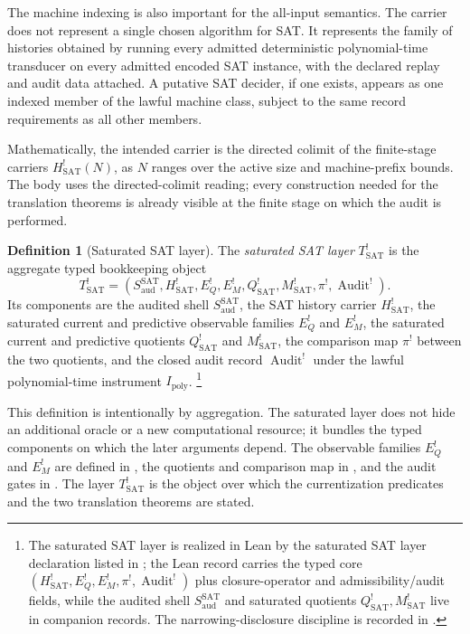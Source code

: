 \documentclass[11pt]{article}
\newcommand{\Tsat}{T^{!}_{\mathrm{SAT}}}
\newcommand{\Saud}{S_{\mathrm{aud}}^{\mathrm{SAT}}}
\newcommand{\Hsat}{H^{!}_{\mathrm{SAT}}}
\newcommand{\HsatN}[1]{H^{!}_{\mathrm{SAT}}(#1)}
\newcommand{\Ipoly}{I_{\mathrm{poly}}}
\newcommand{\EQbang}{E^{!}_{Q}}
\newcommand{\EMbang}{E^{!}_{M}}
\newcommand{\Qsat}{Q^{!}_{\mathrm{SAT}}}
\newcommand{\Msat}{M^{!}_{\mathrm{SAT}}}
\newcommand{\ComparisonMap}{\pi^{!}}
\theoremstyle{definition}
\newtheorem{definition}[theorem]{Definition}
\begin{document}
The machine indexing is also important for the all-input semantics.
The carrier does not represent a single chosen algorithm for SAT.  It
represents the family of histories obtained by running every admitted
deterministic polynomial-time transducer on every admitted encoded SAT
instance, with the declared replay and audit data attached.  A
putative SAT decider, if one exists, appears as one indexed member of
the lawful machine class, subject to the same record requirements as
all other members.

Mathematically, the intended carrier is the directed colimit of the
finite-stage carriers \(\HsatN{N}\), as \(N\) ranges over the active
size and machine-prefix bounds.  The body uses the directed-colimit
reading; every construction needed for the translation theorems is
already visible at the finite stage on which the audit is performed.

\begin{definition}[Saturated SAT layer]
\label{def:pvnp:saturated-closure}
The \emph{saturated SAT layer} \(\Tsat\) is the aggregate typed
bookkeeping object
\[
  \Tsat
  =
  (\Saud,\Hsat,\EQbang,\EMbang,\Qsat,\Msat,\ComparisonMap,
    \operatorname{Audit}^{!}).
\]
Its components are the audited shell \(\Saud\), the SAT history
carrier \(\Hsat\), the saturated current and predictive observable
families \(\EQbang\) and \(\EMbang\), the saturated current and
predictive quotients \(\Qsat\) and \(\Msat\), the comparison map
\(\ComparisonMap\) between the two quotients, and the closed audit
record \(\operatorname{Audit}^{!}\) under the lawful polynomial-time
instrument \(\Ipoly\).
\footnote{The saturated SAT layer is realized in Lean by the saturated
SAT layer declaration listed in ; the Lean
record carries the typed core
\((\Hsat,\EQbang,\EMbang,\ComparisonMap,\operatorname{Audit}^{!})\)
plus closure-operator and admissibility/audit fields, while the
audited shell \(\Saud\) and saturated quotients \(\Qsat,\Msat\) live in
companion records.  The narrowing-disclosure discipline is recorded in
.}
\end{definition}

This definition is intentionally by aggregation.  The saturated layer
does not hide an additional oracle or a new computational resource; it
bundles the typed components on which the later arguments depend.  The
observable families \(\EQbang\) and \(\EMbang\) are defined in
, the quotients and comparison map in
, and the audit gates in .
The layer \(\Tsat\) is the object over which the currentization
predicates and the two translation theorems are stated.
\end{document}
